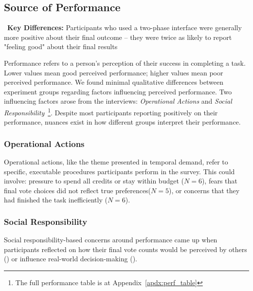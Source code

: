 

\subsection{Source of Performance}
\label{sec:performance}

\begin{tldrbox}
   \faKey~\textbf{Key Differences:} Participants who used a two-phase interface were generally more positive about their final outcome -- they were twice as likely to report "feeling good" about their final results
\end{tldrbox}

Performance refers to a person's perception of their success in completing a task. Lower values mean good perceived performance; higher values mean poor perceived performance. We found minimal qualitative differences between experiment groups regarding factors influencing perceived performance. Two influencing factors arose from the interviews: \textit{Operational Actions} and \textit{Social Responsibility}~\footnote{The full performance table is at Appendix~\ref{apdx:perf_table}}. Despite most participants reporting positively on their performance, nuances exist in how different groups interpret their performance.

\subsubsection{Operational Actions}
Operational actions, like the theme presented in temporal demand, refer to specific, executable procedures participants perform in the survey. This could involve: pressure to spend all credits or stay within budget ($N=6$), fears that final vote choices did not reflect true preferences($N=5$), or concerns that they had finished the task inefficiently ($N=6$).

\subsubsection{Social Responsibility}
Social responsibility-based concerns around performance came up when participants reflected on how their final vote counts would be perceived by others () or influence real-world decision-making ().

